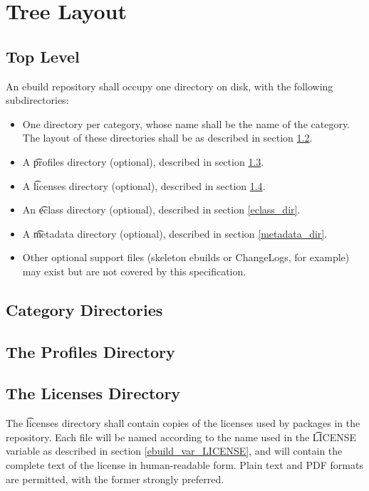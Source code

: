 \chapter{Tree Layout}

\section{Top Level}

An ebuild repository shall occupy one directory on disk, with the following subdirectories:
\begin{itemize}
\item One directory per category, whose name shall be the name of the category. The layout of
    these directories shall be as described in section \ref{category_dirs}.
\item A \t{profiles} directory (optional), described in section \ref{profiles_dir}.
\item A \t{licenses} directory (optional), described in section \ref{licenses_dir}.
\item An \t{eclass} directory (optional), described in section \ref{eclass_dir}.
\item A \t{metadata} directory (optional), described in section \ref{metadata_dir}.
\item Other optional support files (skeleton ebuilds or ChangeLogs, for example) may exist
    but are not covered by this specification.

\end{itemize}

\section{Category Directories}
\label{category_dirs}

\section{The Profiles Directory}
\label{profiles_dir}

\section{The Licenses Directory}
\label{licenses_dir}

The \t{licenses} directory shall contain copies of the licenses used by packages in the
repository. Each file will be named according to the name used in the \t{LICENSE} variable as
described in section \ref{ebuild_var_LICENSE}, and will contain the complete text of the license in
human-readable form. Plain text and PDF formats are permitted, with the former strongly preferred.

